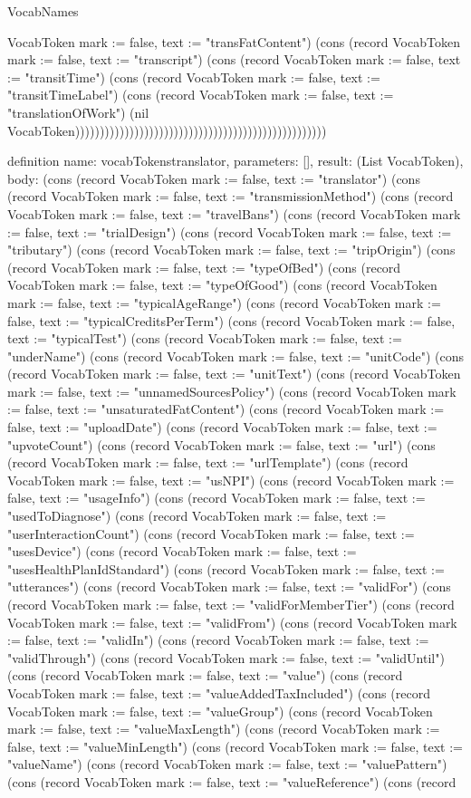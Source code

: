 \begin{lexlean}{VocabNames}
\begin{semanticmodule}
{VocabToken {mark := false, text := "transFatContent"}) (cons (record VocabToken {mark := false, text := "transcript"}) (cons (record VocabToken {mark := false, text := "transitTime"}) (cons (record VocabToken {mark := false, text := "transitTimeLabel"}) (cons (record VocabToken {mark := false, text := "translationOfWork"}) (nil VocabToken)))))))))))))))))))))))))))))))))))))))))))))))))))
}

definition{
  name: vocabTokenstranslator,
  parameters: [],
  result: (List VocabToken),
  body: (cons (record VocabToken {mark := false, text := "translator"}) (cons (record VocabToken {mark := false, text := "transmissionMethod"}) (cons (record VocabToken {mark := false, text := "travelBans"}) (cons (record VocabToken {mark := false, text := "trialDesign"}) (cons (record VocabToken {mark := false, text := "tributary"}) (cons (record VocabToken {mark := false, text := "tripOrigin"}) (cons (record VocabToken {mark := false, text := "typeOfBed"}) (cons (record VocabToken {mark := false, text := "typeOfGood"}) (cons (record VocabToken {mark := false, text := "typicalAgeRange"}) (cons (record VocabToken {mark := false, text := "typicalCreditsPerTerm"}) (cons (record VocabToken {mark := false, text := "typicalTest"}) (cons (record VocabToken {mark := false, text := "underName"}) (cons (record VocabToken {mark := false, text := "unitCode"}) (cons (record VocabToken {mark := false, text := "unitText"}) (cons (record VocabToken {mark := false, text := "unnamedSourcesPolicy"}) (cons (record VocabToken {mark := false, text := "unsaturatedFatContent"}) (cons (record VocabToken {mark := false, text := "uploadDate"}) (cons (record VocabToken {mark := false, text := "upvoteCount"}) (cons (record VocabToken {mark := false, text := "url"}) (cons (record VocabToken {mark := false, text := "urlTemplate"}) (cons (record VocabToken {mark := false, text := "usNPI"}) (cons (record VocabToken {mark := false, text := "usageInfo"}) (cons (record VocabToken {mark := false, text := "usedToDiagnose"}) (cons (record VocabToken {mark := false, text := "userInteractionCount"}) (cons (record VocabToken {mark := false, text := "usesDevice"}) (cons (record VocabToken {mark := false, text := "usesHealthPlanIdStandard"}) (cons (record VocabToken {mark := false, text := "utterances"}) (cons (record VocabToken {mark := false, text := "validFor"}) (cons (record VocabToken {mark := false, text := "validForMemberTier"}) (cons (record VocabToken {mark := false, text := "validFrom"}) (cons (record VocabToken {mark := false, text := "validIn"}) (cons (record VocabToken {mark := false, text := "validThrough"}) (cons (record VocabToken {mark := false, text := "validUntil"}) (cons (record VocabToken {mark := false, text := "value"}) (cons (record VocabToken {mark := false, text := "valueAddedTaxIncluded"}) (cons (record VocabToken {mark := false, text := "valueGroup"}) (cons (record VocabToken {mark := false, text := "valueMaxLength"}) (cons (record VocabToken {mark := false, text := "valueMinLength"}) (cons (record VocabToken {mark := false, text := "valueName"}) (cons (record VocabToken {mark := false, text := "valuePattern"}) (cons (record VocabToken {mark := false, text := "valueReference"}) (cons (record }
\end{semanticmodule}
\end{lexlean}
